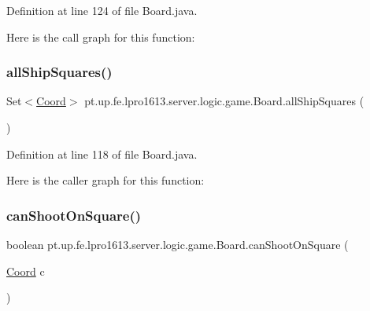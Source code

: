 Definition at line 124 of file Board.\+java.

Here is the call graph for this function\+:
\hypertarget{classpt_1_1up_1_1fe_1_1lpro1613_1_1server_1_1logic_1_1game_1_1_board_ab60a6234f1c71f63d6f7fcb69d2186d8}{}\label{classpt_1_1up_1_1fe_1_1lpro1613_1_1server_1_1logic_1_1game_1_1_board_ab60a6234f1c71f63d6f7fcb69d2186d8} 
\subsubsection{\texorpdfstring{all\+Ship\+Squares()}{allShipSquares()}}
{\footnotesize\ttfamily Set$<$\hyperlink{classpt_1_1up_1_1fe_1_1lpro1613_1_1sharedlib_1_1utils_1_1_coord}{Coord}$>$ pt.\+up.\+fe.\+lpro1613.\+server.\+logic.\+game.\+Board.\+all\+Ship\+Squares (\begin{DoxyParamCaption}{ }\end{DoxyParamCaption})}



Definition at line 118 of file Board.\+java.

Here is the caller graph for this function\+:
\hypertarget{classpt_1_1up_1_1fe_1_1lpro1613_1_1server_1_1logic_1_1game_1_1_board_aa790ab38adc17bb119335c5f8fa05d2f}{}\label{classpt_1_1up_1_1fe_1_1lpro1613_1_1server_1_1logic_1_1game_1_1_board_aa790ab38adc17bb119335c5f8fa05d2f} 
\subsubsection{\texorpdfstring{can\+Shoot\+On\+Square()}{canShootOnSquare()}}
{\footnotesize\ttfamily boolean pt.\+up.\+fe.\+lpro1613.\+server.\+logic.\+game.\+Board.\+can\+Shoot\+On\+Square (\begin{DoxyParamCaption}\item[{\hyperlink{classpt_1_1up_1_1fe_1_1lpro1613_1_1sharedlib_1_1utils_1_1_coord}{Coord}}]{c }\end{DoxyParamCaption})}



